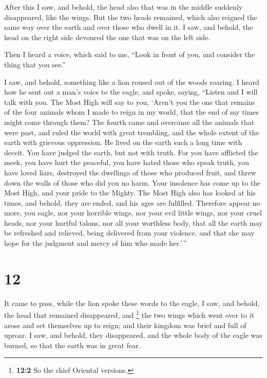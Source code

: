 After this I saw, and behold, the head also that was in
the middle suddenly disappeared, like the wings.  But the
two heads remained, which also reigned the same way over the earth and
over those who dwell in it.  I saw, and behold, the head
on the right side devoured the one that was on the left side.

 Then I heard a voice, which said to me, ``Look in front
of you, and consider the thing that you see.''

 I saw, and behold, something like a lion roused out of
the woods roaring. I heard how he sent out a man's voice to the eagle,
and spoke, saying,  ``Listen and I will talk with you.
The Most High will say to you,  `Aren't you the one that
remains of the four animals whom I made to reign in my world, that the
end of my times might come through them?  The fourth came
and overcame all the animals that were past, and ruled the world with
great trembling, and the whole extent of the earth with grievous
oppression. He lived on the earth such a long time with deceit.
 You have judged the earth, but not with truth.
 For you have afflicted the meek, you have hurt the
peaceful, you have hated those who speak truth, you have loved liars,
destroyed the dwellings of those who produced fruit, and threw down the
walls of those who did you no harm.  Your insolence has
come up to the Most High, and your pride to the Mighty. 
The Most High also has looked at his times, and behold, they are ended,
and his ages are fulfilled.  Therefore appear no more,
you eagle, nor your horrible wings, nor your evil little wings, nor your
cruel heads, nor your hurtful talons, nor all your worthless body,
 that all the earth may be refreshed and relieved, being
delivered from your violence, and that she may hope for the judgment and
mercy of him who made her.'\,''

\hypertarget{section-11}{%
\section{12}\label{section-11}}

 It came to pass, while the lion spoke these words to the
eagle, I saw,  and behold, the head that remained
disappeared, and \footnote{\textbf{12:2} So the chief Oriental versions.}
the two wings which went over to it arose and set themselves up to
reign; and their kingdom was brief and full of uproar.  I
saw, and behold, they disappeared, and the whole body of the eagle was
burned, so that the earth was in great fear.

